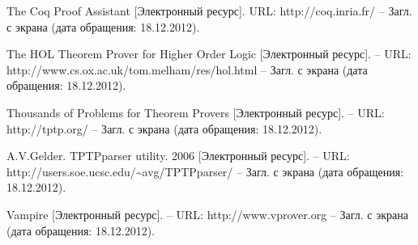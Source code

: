 \begin{thebibliography}{99}
 The Coq Proof Assistant [Электронный ресурс]. URL: http://coq.inria.fr/ -- Загл. с экрана (дата обращения: 18.12.2012).

 The HOL Theorem Prover for Higher Order Logic [Электронный ресурс]. -- URL: http://www.cs.ox.ac.uk/tom.melham/res/hol.html -- Загл. с экрана (дата обращения: 18.12.2012).

 Thousands of Problems for Theorem Provers [Электронный ресурс]. -- URL: http://tptp.org/ -- Загл. с экрана (дата обращения: 18.12.2012).

 A.V.Gelder. TPTPparser utility. 2006 [Электронный ресурс]. -- URL: http://users.soe.ucsc.edu/\~{}avg/TPTPparser/ -- Загл. с экрана (дата обращения: 18.12.2012).

 Vampire [Электронный ресурс]. -- URL: http://www.vprover.org -- Загл. с экрана (дата обращения: 18.12.2012).








\end{thebibliography}



